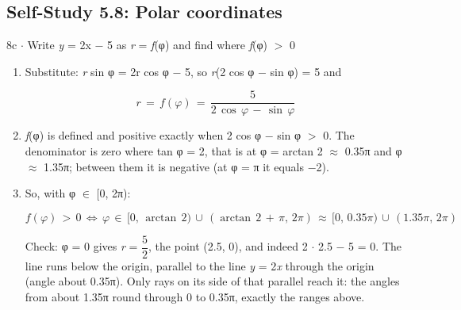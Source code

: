 \documentclass[11pt]{article}
\begin{document}
\begin{keepsection}\subsection{Self-Study 5.8: Polar coordinates}

\begin{workedbox}{8c \ensuremath{\cdot} Write \textit{y} = 2x \ensuremath{-} 5 as \textit{r} = \textit{f}(φ) and find where \textit{f}(φ) \ensuremath{>} 0}
\begin{enumerate}
\item {}
Substitute: \textit{r} sin φ = 2r cos φ \ensuremath{-} 5, so \textit{r}(2 cos φ \ensuremath{-} sin φ) = 5 and

\begin{equation*}{r}\, =\, {f}(φ)\, =\, \dfrac{5}{2\, \cos \, φ\, -\, \sin \, φ}\end{equation*}
\item \textit{f}(φ) is defined and positive exactly when 2 cos φ \ensuremath{-} sin φ \ensuremath{>} 0. The denominator is zero where tan φ = 2, that is at φ = arctan 2 \ensuremath{\approx} 0.35π and φ \ensuremath{\approx} 1.35π; between them it is negative (at φ = π it equals \ensuremath{-}2).
\item {}
So, with φ \ensuremath{\in} [0, 2π):

\begin{equation*}{f}(φ)\, >\, 0\, \Leftrightarrow \, φ\, \in \, [0,\, \arctan \, 2)\, \cup \, (\arctan \, 2\, +\, π,\, 2π)\, \approx \, [0,\, 0.35π)\, \cup \, (1.35π,\, 2π)\end{equation*}

Check: φ = 0 gives \textit{r} = {\small\ensuremath{\dfrac{5}{2}}}, the point (2.5, 0), and indeed 2 \ensuremath{\cdot} 2.5 \ensuremath{-} 5 = 0. The line runs below the origin, parallel to the line \textit{y} = 2\textit{x} through the origin (angle about 0.35π). Only rays on its side of that parallel reach it: the angles from about 1.35π round through 0 to 0.35π, exactly the ranges above.
\end{enumerate}
\end{workedbox}

\end{keepsection}
\end{document}
